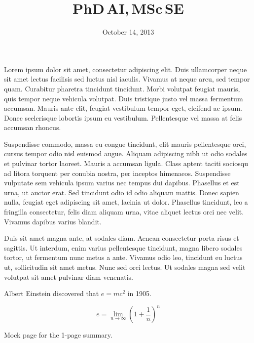 \documentclass[11pt,a4paper,sans]{moderncv}
\title{PhD{\smaller[2]\,AI},\,MSc{\smaller[2]\,SE}}
\date{October 14, 2013}
\begin{document}
\makelettertitle

Lorem ipsum dolor sit amet, consectetur adipiscing elit. Duis ullamcorper neque sit amet lectus facilisis sed luctus nisl iaculis. Vivamus at neque arcu, sed tempor quam. Curabitur pharetra tincidunt tincidunt. Morbi volutpat feugiat mauris, quis tempor neque vehicula volutpat. Duis tristique justo vel massa fermentum accumsan. Mauris ante elit, feugiat vestibulum tempor eget, eleifend ac ipsum. Donec scelerisque lobortis ipsum eu vestibulum. Pellentesque vel massa at felis accumsan rhoncus.

Suspendisse commodo, massa eu congue tincidunt, elit mauris pellentesque orci, cursus tempor odio nisl euismod augue. Aliquam adipiscing nibh ut odio sodales et pulvinar tortor laoreet. Mauris a accumsan ligula. Class aptent taciti sociosqu ad litora torquent per conubia nostra, per inceptos himenaeos. Suspendisse vulputate sem vehicula ipsum varius nec tempus dui dapibus. Phasellus et est urna, ut auctor erat. Sed tincidunt odio id odio aliquam mattis. Donec sapien nulla, feugiat eget adipiscing sit amet, lacinia ut dolor. Phasellus tincidunt, leo a fringilla consectetur, felis diam aliquam urna, vitae aliquet lectus orci nec velit. Vivamus dapibus varius blandit.

Duis sit amet magna ante, at sodales diam. Aenean consectetur porta risus et sagittis. Ut interdum, enim varius pellentesque tincidunt, magna libero sodales tortor, ut fermentum nunc metus a ante. Vivamus odio leo, tincidunt eu luctus ut, sollicitudin sit amet metus. Nunc sed orci lectus. Ut sodales magna sed velit volutpat sit amet pulvinar diam venenatis.

Albert Einstein discovered that $e=mc^2$ in 1905.

\[ e=\lim_{n \to \infty} \left(1+\frac{1}{n}\right)^n \]

\makeletterclosing

\clearpage
\makecvtitle





% 

\clearpage
\maketitle{}


\clearpage
\maketitle{}
Mock page for the 1-page summary.
\end{document}
